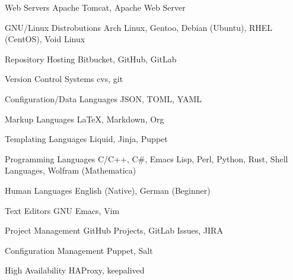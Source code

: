 

\begin{cvskills}

  \cvskill
    {Web Servers} %
    {Apache Tomcat, Apache Web Server} %

  \cvskill
    {GNU/Linux Distrobutions} %
    {Arch Linux, Gentoo, Debian (Ubuntu), RHEL (CentOS), Void Linux} %

  \cvskill
    {Repository Hosting} %
    {Bitbucket, GitHub, GitLab} %

  \cvskill
    {Version Control Systems} %
    {cvs, git} %

  \cvskill
    {Configuration/Data Languages} %
    {JSON, TOML, YAML} %

  \cvskill
    {Markup Languages} %
    {LaTeX, Markdown, Org} %

  \cvskill
    {Templating Languages} %
    {Liquid, Jinja, Puppet} %

  \cvskill
    {Programming Languages} %
    {C/C++, C\#, Emacs Lisp, Perl, Python, Rust, Shell Languages, Wolfram (Mathematica)} %

  \cvskill
    {Human Languages} %
    {English (Native), German (Beginner)} %

  \cvskill
    {Text Editors} %
    {GNU Emacs, Vim} %

  \cvskill
    {Project Management} %
    {GitHub Projects, GitLab Issues, JIRA} %

  \cvskill
    {Configuration Management} %
    {Puppet, Salt} %

  \cvskill
    {High Availability} %
    {HAProxy, keepalived} %

\end{cvskills}
